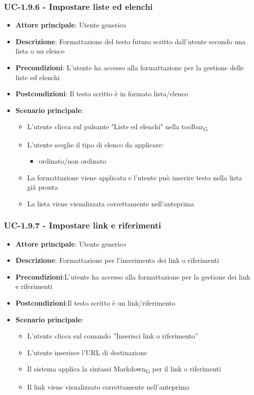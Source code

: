 \documentclass[11pt,a4paper]{article}
\newcommand{\gls}[1]{#1\textsubscript{G}}
\begin{document}
\subsubsection{UC-1.9.6 - Impostare liste ed elenchi}
\begin{itemize}
    \item \textbf{Attore principale}: Utente generico
    \item \textbf{Descrizione}: Formattazione del testo futuro scritto dall’utente secondo una lista o un elenco
    \item \textbf{Precondizioni}: L’utente ha accesso alla formattazione per la gestione delle liste ed elenchi
    \item \textbf{Postcondizioni}: Il testo scritto è in formato lista/elenco
    \item \textbf{Scenario principale}:
        \begin{itemize}
            \item L’utente clicca sul pulsante "Liste ed elenchi" nella \gls{toolbar}
            \item L’utente sceglie il tipo di elenco da applicare:
                \begin{itemize}
                    \item ordinato/non ordinato
                \end{itemize}
            \item La formattazione viene applicata e l'utente può inserire testo nella lista già pronta
            \item La lista viene visualizzata correttamente nell'anteprima
        \end{itemize}
\end{itemize}

\subsubsection{UC-1.9.7 - Impostare link e riferimenti}
\begin{itemize}
    \item \textbf{Attore principale}: Utente generico
    \item \textbf{Descrizione}: Formattazione per l’inserimento dei link o riferimenti
    \item \textbf{Precondizioni}:L’utente ha accesso alla formattazione per la gestione dei link e riferimenti
    \item \textbf{Postcondizioni}:Il testo scritto è un link/riferimento
    \item \textbf{Scenario principale}:
        \begin{itemize}
            \item L’utente clicca sul comando ”Inserisci link o riferimento”
            \item L’utente inserisce l’URL di destinazione
            \item Il sistema applica la sintassi \gls{Markdown} per il link o riferimenti
            \item Il link viene visualizzato correttamente nell'anteprima
        \end{itemize}
\end{itemize}
\end{document}
